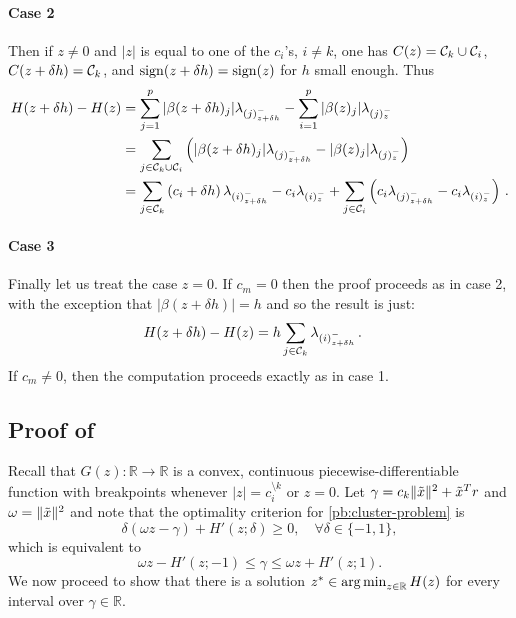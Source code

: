\paragraph{Case 2}
Then if  $z \neq 0$ and $|z|$ is equal to one of the $c_i$'s, $i \neq k$,  one has $C(z) = \mathcal{C}_k \cup \mathcal{C}_i$, $C(z + \delta h) = \mathcal{C}_k$, and $\operatorname{sign}(z + \delta h) = \operatorname{sign}(z)$ for $h$ small enough.
Thus
\begin{align}
  H(z + \delta h) - H(z)
   & = \sum_{j =1}^p |\beta(z + \delta h)_j| \lambda_{(j)^-_{z + \delta h}}
  - \sum_{i=1}^p |\beta(z)_j| \lambda_{(j)^-_z}  \nonumber                                         \\
   & = \sum_{j \in \mathcal{C}_k \cup \mathcal{C}_i} \left( |\beta(z + \delta h)_j| \lambda_{(j)^-_{z + \delta h}}
  - |\beta(z)_j| \lambda_{(j)^-_z} \right)  \nonumber                                              \\
   & = \sum_{j \in \mathcal{C}_k} \left( c_i + \delta h \right) \lambda_{(i)^-_{z + \delta h}}
  - c_i \lambda_{(i)^-_z}
  + \sum_{j \in \mathcal{C}_i} \left( c_i \lambda_{(j)^-_{z + \delta h}}
    - c_i \lambda_{(i)^-_z} \right) \, .
\end{align}

\paragraph{Case 3} Finally let us treat the case $z = 0$.
If $c_m = 0$ then the proof proceeds as in case 2, with the exception that $|\beta(z + \delta h)| = h$ and so the result is just:
\begin{align}
  H(z + \delta h) - H(z)
   & = h \sum_{j \in \mathcal{C}_k} \lambda_{(i)^-_{z + \delta h}} \, .
\end{align}
If $c_m \neq 0$, then the computation proceeds exactly as in case 1.

\subsection{Proof of }

Recall that \(G(z) : \mathbb{R} \to \mathbb{R}\) is a convex,
continuous piecewise-differentiable function with breakpoints whenever \(|z| =
c_i^{\setminus k}\) or \(z = 0\). Let \(\gamma = c_k \lVert {\tilde{x}} \rVert^2+ \tilde x^Tr\)
and \(\omega = \lVert {\tilde{x}} \rVert^2\) and note that the optimality criterion for
\eqref{pb:cluster-problem} is
\[
  \delta(\omega z - \gamma) + H'(z; \delta) \geq 0, \quad
  \forall \delta \in \{-1, 1\},
\]
which is equivalent to
\begin{equation}
  \label{eq:optimality-inequality}
  \omega z - H'(z; -1) \leq \gamma \leq \omega z + H'(z; 1).
\end{equation}
We now proceed to show that there is a solution \(z^* \in \operatorname*{arg\,min}_{z \in
  \mathbb{R}} H(z)\) for every interval over \(\gamma \in \mathbb{R}\).

